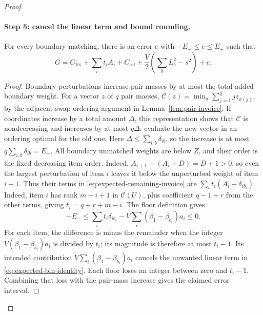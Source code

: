 \begin{proof}
\paragraph{Step 5: cancel the linear term and bound rounding.}
\begin{claim}
For every boundary matching, there is an error $e$ with
$-E_-\le e\le E_+$ such that
\begin{equation}\label{eq:expected-quadratic-gap}
 G=G_{\mathrm{fix}}+\sum_i t_iA_i+C_{\mathrm{ref}}+
       \frac V2\left(\sum_bL_b^2-s^2\right)+e.
\end{equation}
\end{claim}
\begin{proof}
Boundary perturbations increase pair masses by at most the total
added boundary weight. For a vector $z$ of $q$ pair masses,
$\mathcal C(z)=\min_\sigma\sum_{j=1}^q jz_{\sigma(j)}$, by the
adjacent-swap ordering argument in Lemma~\ref{lem:pair-invoice}.
If coordinates increase by a total
amount $\Delta$, this representation shows that $\mathcal C$ is
nondecreasing and increases by at most $q\Delta$: evaluate the new
vector in an ordering optimal for the old one. Here
$\Delta\le\sum_{i,b}\delta_{ib}$, so the increase is at most
$q\sum_{i,b}\delta_{ib}=E_+$.
All boundary unmatched weights are below $Z$, and their order is
the fixed decreasing item order. Indeed,
$A_{i+1}-(A_i+D)=D+1>0$, so even the largest perturbation of item
$i$ leaves it below the unperturbed weight of item $i+1$.
Thus their terms in \eqref{eq:expected-remaining-invoice} are
$\sum_i t_i(A_i+\delta_{ib_i})$.
Indeed, item $i$ has rank $m-i+1$ in $\mathcal C(U)$, plus
coefficient $q-1+r$ from the other terms, giving $t_i=q+r+m-i$.
The floor definition gives
\[
 -E_-\le
 \sum_i t_i\delta_{ib_i}
       -V\sum_i(\beta_1-\beta_{b_i})a_i
 \le0.
\]
For each item, the difference is minus the remainder when the
integer $V(\beta_1-\beta_{b_i})a_i$ is divided by $t_i$; its
magnitude is therefore at most $t_i-1$.
Its intended contribution
$V\sum_i(\beta_1-\beta_{b_i})a_i$ cancels the unwanted linear
term in \eqref{eq:expected-bin-identity}.
Each floor loses an integer between zero and $t_i-1$.
Combining that loss with the pair-mass increase gives
the claimed error interval.
\end{proof}


\end{proof}
